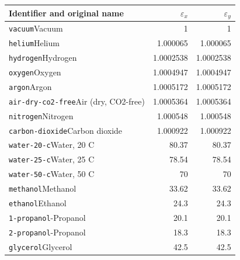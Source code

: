 \begin{longtable}{@{}p{.69\linewidth}rr@{}}
Identifier and original name & $\varepsilon_x$ & $\varepsilon_y$\\\hline
\endhead
\texttt{vacuum}\newline Vacuum & 1 & 1\\[2pt]
\texttt{helium}\newline Helium & 1.000065 & 1.000065\\[2pt]
\texttt{hydrogen}\newline Hydrogen & 1.0002538 & 1.0002538\\[2pt]
\texttt{oxygen}\newline Oxygen & 1.0004947 & 1.0004947\\[2pt]
\texttt{argon}\newline Argon & 1.0005172 & 1.0005172\\[2pt]
\texttt{air-dry-co2-free}\newline Air (dry, CO2-free) & 1.0005364 & 1.0005364\\[2pt]
\texttt{nitrogen}\newline Nitrogen & 1.000548 & 1.000548\\[2pt]
\texttt{carbon-dioxide}\newline Carbon dioxide & 1.000922 & 1.000922\\[2pt]
\texttt{water-20-c}\newline Water, 20 C & 80.37 & 80.37\\[2pt]
\texttt{water-25-c}\newline Water, 25 C & 78.54 & 78.54\\[2pt]
\texttt{water-50-c}\newline Water, 50 C & 70 & 70\\[2pt]
\texttt{methanol}\newline Methanol & 33.62 & 33.62\\[2pt]
\texttt{ethanol}\newline Ethanol & 24.3 & 24.3\\[2pt]
\texttt{1-propanol}\newline 1-Propanol & 20.1 & 20.1\\[2pt]
\texttt{2-propanol}\newline 2-Propanol & 18.3 & 18.3\\[2pt]
\texttt{glycerol}\newline Glycerol & 42.5 & 42.5\\[2pt]

\end{longtable}
